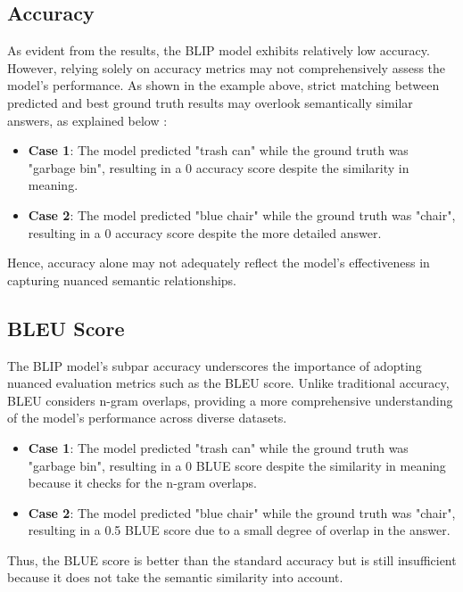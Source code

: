 \subsection{Accuracy}
As evident from the results, the BLIP model exhibits relatively low accuracy. However, relying solely on accuracy metrics may not comprehensively assess the model's performance. As shown in the example above, strict matching between predicted and best ground truth results may overlook semantically similar answers, as explained below : \\
\begin{itemize}
    \item \textbf{Case 1}: The model predicted "trash can" while the ground truth was "garbage bin", resulting in a 0 accuracy score despite the similarity in meaning.
    \item \textbf{Case 2}: The model predicted "blue chair" while the ground truth was "chair", resulting in a 0 accuracy score despite the more detailed answer.
\end{itemize}


Hence, accuracy alone may not adequately reflect the model's effectiveness in capturing nuanced semantic relationships.

\subsection{BLEU Score}

The BLIP model's subpar accuracy underscores the importance of adopting nuanced evaluation metrics such as the BLEU score. Unlike traditional accuracy, BLEU considers n-gram overlaps, providing a more comprehensive understanding of the model's performance across diverse datasets.

\begin{itemize}
    \item \textbf{Case 1}: The model predicted "trash can" while the ground truth was "garbage bin", resulting in a 0 BLUE score despite the similarity in meaning because it checks for the n-gram overlaps.
    \item \textbf{Case 2}: The model predicted "blue chair" while the ground truth was "chair", resulting in a 0.5 BLUE score due to a small degree of overlap in the answer.
\end{itemize}

Thus, the BLUE score is better than the standard accuracy but is still insufficient because it does not take the semantic similarity into account.


